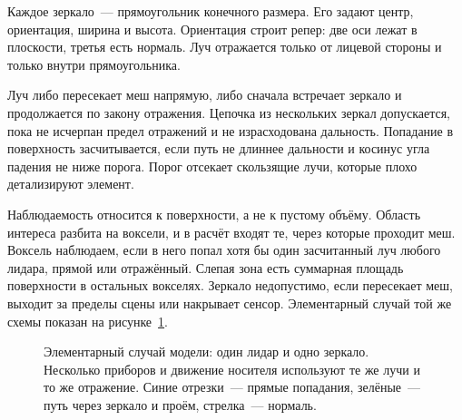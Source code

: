 \documentclass{misisarticle}
\begin{document}
Каждое зеркало~--- прямоугольник конечного размера. Его задают центр, ориентация, ширина и высота. Ориентация строит репер: две оси лежат в плоскости, третья есть нормаль. Луч отражается только от лицевой стороны и только внутри прямоугольника.

Луч либо пересекает меш напрямую, либо сначала встречает зеркало и продолжается по закону отражения. Цепочка из нескольких зеркал допускается, пока не исчерпан предел отражений и не израсходована дальность. Попадание в поверхность засчитывается, если путь не длиннее дальности и косинус угла падения не ниже порога. Порог отсекает скользящие лучи, которые плохо детализируют элемент.

Наблюдаемость относится к поверхности, а не к пустому объёму. Область интереса разбита на воксели, и в расчёт входят те, через которые проходит меш. Воксель наблюдаем, если в него попал хотя бы один засчитанный луч любого лидара, прямой или отражённый. Слепая зона есть суммарная площадь поверхности в остальных вокселях. Зеркало недопустимо, если пересекает меш, выходит за пределы сцены или накрывает сенсор. Элементарный случай той же схемы показан на рисунке~\ref{fig:scheme}.

\begin{figure}[htbp]
  \centering
  \caption{Элементарный случай модели: один лидар и одно зеркало. Несколько приборов и движение носителя используют те же лучи и то же отражение. Синие отрезки~--- прямые попадания, зелёные~--- путь через зеркало и проём, стрелка~--- нормаль.}
  \label{fig:scheme}
\end{figure}
\end{document}
